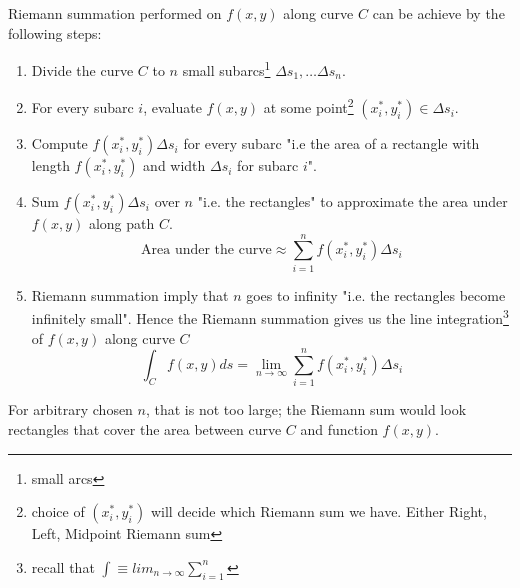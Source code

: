 \documentclass[../../main.tex]{subfiles}
\begin{document}
	\begin{solution}
		Riemann summation performed on $f(x, y)$ along curve $C$ can be achieve by the following steps:
		\begin{enumerate}
			\item Divide the curve $C$ to $n$ small subarcs\footnote{small arcs} $\Delta s_1, \dots \Delta s_n$.
			\item For every subarc $i$, evaluate $f(x,y)$ at some point\footnote{choice of $(x_i^*, y_i^*)$ will decide which Riemann sum we have. Either Right, Left, Midpoint Riemann sum} $(x_i^*, y_i^*) \in \Delta s_i$.
			\item Compute $f(x_i^*, y_i^*) \Delta s_i$ for every subarc "i.e the area of a rectangle with length $f(x_i^*, y_i^*)$ and width $\Delta s_i$ for subarc $i$".
			\item Sum $f(x_i^*, y_i^*) \Delta s_i$ over $n$ "i.e. the rectangles" to approximate the area under $f(x,y)$ along path $C$.
				\begin{equation*}
					\text{Area under the curve} \approx \sum_{i=1}^n f(x_i^*, y_i^*) \Delta s_i 
				\end{equation*}
			\item Riemann summation imply that $n$ goes to infinity "i.e. the rectangles become infinitely small". Hence the Riemann summation gives us the line integration\footnote{recall that $\int \equiv lim_{n \rightarrow \infty} \sum_{i=1}^n$} of $f(x,y)$ along curve $C$
				\begin{equation*}
					\int_C f(x, y) ds = \lim_{n \rightarrow \infty} \sum_{i=1}^n f(x_i^*, y_i^*) \Delta s_i 
				\end{equation*}
		\end{enumerate}
		
		\par For arbitrary chosen $n$, that is not too large; the Riemann sum would look rectangles that cover the area between curve $C$ and function $f(x,y)$.
			\begin{figure*}[h]
				\begin{subfigure}[c]{0.43\textwidth}
					\centering
\end{subfigure}
\end{figure*}
\end{solution}
\end{document}

